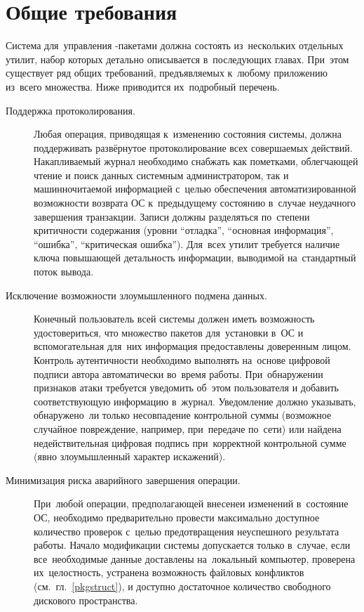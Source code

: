 
\section{Общие требования}

Система для~управления -пакетами должна состоять из~нескольких отдельных утилит,
набор которых детально описывается в~последующих главах.
При~этом существует ряд общих требований, предъявляемых к~любому приложению из~всего множества.
Ниже приводится их~подробный перечень.

\begin{description}

\item[Поддержка протоколирования.]
Любая операция, приводящая к~изменению состояния системы, 
должна поддерживать развёрнутое протоколирование всех совершаемых  действий.
Накапливаемый журнал необходимо снабжать как пометками, облегчающей чтение и поиск данных системным администратором,
так и машинночитаемой информацией с~целью обеспечения автоматизированной возможности 
возврата ОС к~предыдущему состоянию в~случае неудачного завершения транзакции. 
Записи должны разделяться по~степени критичности содержания 
(уровни ``отладка'', ``основная информация'', ``ошибка'', ``критическая ошибка'').
Для~всех утилит требуется наличие ключа  повышающей детальность информации,
выводимой на~стандартный поток вывода.

\item[Исключение возможности злоумышленного подмена данных.]
Конечный пользователь всей системы должен иметь возможность удостовериться, что множество пакетов для~установки в~ОС и 
вспомогательная для~них информация предоставлены доверенным лицом.
Контроль аутентичности необходимо выполнять на~основе цифровой подписи   автора  автоматически  во~время работы.
При~обнаружении признаков атаки требуется уведомить об~этом пользователя и добавить соответствующую информацию в~журнал.
Уведомление должно указывать, обнаружено~ли только несовпадение контрольной суммы (возможное случайное повреждение, например, при~передаче по~сети)
или найдена недействительная цифровая подпись при~корректной контрольной сумме (явно злоумышленный характер искажений).

\item[Минимизация риска аварийного завершения операции.]
При~любой операции, предполагающей внесенеи изменений в~состояние ОС, необходимо предварительно 
провести максимально доступное количество проверок с~целью предотвращения неуспешного результата работы.
Начало модификации системы допускается только в~случае, если все~необходимые данные доставлены на~локальный компьютер,
проверена их~целостность, устранена возможность файловых конфликтов (см.~гл.~\ref{pkgstruct}), и доступно достаточное количество свободного дискового пространства.


\end{description}
